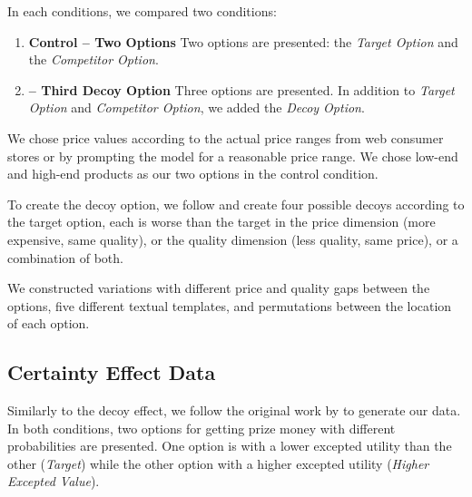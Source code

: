 In each conditions, we compared two conditions:
\begin{enumerate}
    \item \textbf{Control -- Two Options} Two options are presented: the \textit{Target Option} and the \textit{Competitor Option}.
    \item \textbf{\Biaseddataset{} -- Third Decoy Option} Three options are presented. In addition to \textit{Target Option} and \textit{Competitor Option}, we added the \textit{Decoy Option}.
\end{enumerate}

We chose price values according to the actual price ranges from web consumer stores or by prompting the model for a reasonable price range.
We chose low-end and high-end products as our two options in the control condition.

To create the decoy option, we follow \citep{huber1982adding} and create four possible decoys according to the target option, each is worse than the target in the price dimension (more expensive, same quality), or the quality dimension (less quality, same price), or a combination of both.


We constructed variations with different price and quality gaps between the options, five different textual templates, and permutations between the location of each option.


\subsection{Certainty Effect Data}
Similarly to the decoy effect, we follow the original work by \citet{kahneman1979prospect} to generate our data.
In both conditions,  two options for getting prize money with different probabilities are presented. One option is with a lower excepted utility than the other (\textit{Target}) while the other option with a higher excepted utility (\textit{Higher Excepted Value}).

